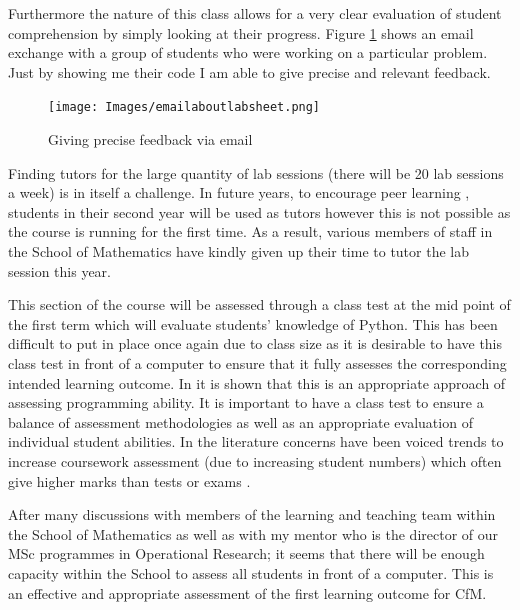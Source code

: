 \documentclass{article}
\begin{document}
Furthermore the nature of this class allows for a very clear evaluation of student comprehension by simply looking at their progress. Figure \ref{emailaboutlabsheet} shows an email exchange with a group of students who were working on a particular problem. Just by showing me their code I am able to give precise and relevant feedback.

\begin{figure}[htdp]
\begin{center}
\texttt{[image: Images/emailaboutlabsheet.png]}
\end{center}
\caption{Giving precise feedback via email}\label{emailaboutlabsheet}
\end{figure}

Finding tutors for the large quantity of lab sessions (there will be 20 lab sessions a week) is in itself a challenge. In future years, to encourage peer learning \cite{crouch_peer_2001, falchikov_learning_2002}, students in their second year will be used as tutors however this is not possible as the course is running for the first time. As a result, various members of staff in the School of Mathematics have kindly given up their time to tutor the lab session this year.

This section of the course will be assessed through a class test at the mid point of the first term which will evaluate students' knowledge of Python. This has been difficult to put in place once again due to class size as it is desirable to have this class test in front of a computer to ensure that it fully assesses the corresponding intended learning outcome. In \cite{chamillard_evaluating_2000} it is shown that this is an appropriate approach of assessing programming ability. It is important to have a class test to ensure a balance of assessment methodologies as well as an appropriate evaluation of individual student abilities. In the literature concerns have been voiced trends to increase coursework assessment (due to increasing student numbers) \cite{gibbs_coursework_1997} which often give higher marks than tests or exams \cite{bridges_coursework_2002}.

After many discussions with members of the learning and teaching team within the School of Mathematics as well as with my mentor who is the director of our MSc programmes in Operational Research; it seems that there will be enough capacity within the School to assess all students in front of a computer. This is an effective and appropriate assessment of the first learning outcome for CfM.
\end{document}
